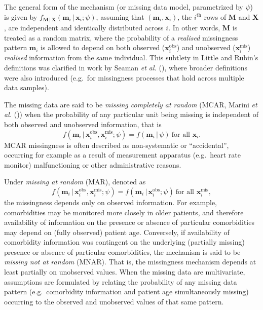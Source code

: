 \documentclass[
  letterpaper,
  DIV=11,
  numbers=noendperiod]{scrreprt}
\newcommand{\given}{\,|\,}
\begin{document}
The general form of the mechanism (or missing data model, parametrized
by \(\psi\)) is given by
\(f_{\mathbf{M} \given \mathbf{X}}(\mathbf{m}_i \given \mathbf{x}_i;\psi)\),
assuming that \((\mathbf{m}_i,\mathbf{x}_i)\), the \(i^{\text{th}}\)
rows of \(\mathbf{M}\) and \(\mathbf{X}\), are independent and
identically distributed across \(i\). In other words, \(\mathbf{M}\) is
treated as a random matrix, where the probability of a \emph{realised}
missingness pattern \(\mathbf{m}_i\) is allowed to depend on both
observed (\(\mathbf{x}_i^{\text{obs}}\)) and unobserved
(\(\mathbf{x}_i^{\text{mis}}\)) \emph{realised} information from the
same individual. This subtlety in Little and Rubin's definitions was
clarified in work by Seaman \emph{et al.}
(), where broader
definitions were also introduced (e.g.~for missingness processes that
hold across multiple data samples).

The missing data are said to be \emph{missing completely at random}
(MCAR, Marini \emph{et al.}
()) when
the probability of any particular unit being missing is independent of
both observed and unobserved information, that is \[
f(\mathbf{m}_i \given \mathbf{x}_i^{\text{obs}},\mathbf{x}_i^{\text{mis}};\psi) = f(\mathbf{m}_i \given \psi)  \ \text{for all } \mathbf{x}_i.
\] MCAR missingness is often described as non-systematic or
``accidental'', occurring for example as a result of measurement
apparatus (e.g.~heart rate monitor) malfunctioning or other
administrative reasons.

Under \emph{missing at random} (MAR), denoted as \[
f(\mathbf{m}_i \given \mathbf{x}_i^{\text{obs}},\mathbf{x}_i^{\text{mis}};\psi) = f(\mathbf{m}_i \given \mathbf{x}_i^{\text{obs}}; \psi) \ \text{for all } \mathbf{x}_i^{\text{mis}},
\] the missingness depends only on observed information. For example,
comorbidities may be monitored more closely in older patients, and
therefore availability of information on the presence or absence of
particular comorbidities may depend on (fully observed) patient age.
Conversely, if availability of comorbidity information was contingent on
the underlying (partially missing) presence or absence of particular
comorbidities, the mechanism is said to be \emph{missing not at random}
(MNAR). That is, the missingness mechanism depends at least partially on
unobserved values. When the missing data are multivariate, assumptions
are formulated by relating the probability of any missing data pattern
(e.g.~comorbidity information and patient age simultaneously missing)
occurring to the observed and unobserved values of that same pattern.
\end{document}
